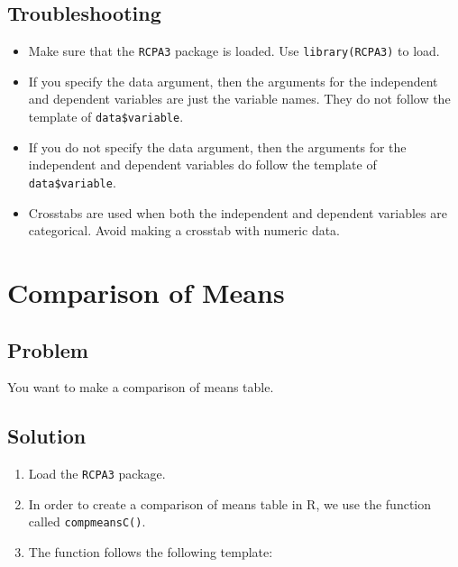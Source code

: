 \documentclass[
]{book}
\providecommand{\tightlist}{%
  \setlength{\itemsep}{0pt}\setlength{\parskip}{0pt}}
\begin{document}
\hypertarget{troubleshooting-26}{%
\subsection{Troubleshooting}\label{troubleshooting-26}}

\begin{itemize}
\tightlist
\item
  Make sure that the \texttt{RCPA3} package is loaded. Use \texttt{library(RCPA3)} to load.
\item
  If you specify the data argument, then the arguments for the independent and dependent variables are just the variable names. They do not follow the template of \texttt{data\$variable}.
\item
  If you do not specify the data argument, then the arguments for the independent and dependent variables do follow the template of \texttt{data\$variable}.
\item
  Crosstabs are used when both the independent and dependent variables are categorical. Avoid making a crosstab with numeric data.
\end{itemize}

\hypertarget{compmeans}{%
\section{Comparison of Means}\label{compmeans}}

\hypertarget{problem-30}{%
\subsection{Problem}\label{problem-30}}

You want to make a comparison of means table.

\hypertarget{solution-29}{%
\subsection{Solution}\label{solution-29}}

\begin{enumerate}
\def\labelenumi{\arabic{enumi}.}
\tightlist
\item
  Load the \texttt{RCPA3} package.
\item
  In order to create a comparison of means table in R, we use the function called \texttt{compmeansC()}.\\
\item
  The function follows the following template:
\end{enumerate}
\end{document}
